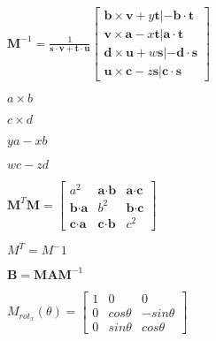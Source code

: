 \documentclass{article}
\def\lthtmlcheckvsize{\ifdim\ht\sizebox<\vsize 
  \ifdim\wd\sizebox<\hsize\expandafter\hfill\fi \expandafter\vfill
  \else\expandafter\vss\fi}%
\begin{document}
{\newpage\clearpage
{}%
$ \textbf{M}^{-1} = \frac{1}{\textbf{s} \cdot \textbf{v} + \textbf{t} \cdot \textbf{u}}
\begin{bmatrix}
\textbf{b} \times \textbf{v} + y\textbf{t} | -\textbf{b} \cdot \textbf{t} \\
\textbf{v} \times \textbf{a} - x\textbf{t} | \textbf{a} \cdot \textbf{t} \\
\textbf{d} \times \textbf{u} + w\textbf{s} | -\textbf{d} \cdot \textbf{s} \\
\textbf{u} \times \textbf{c} - z\textbf{s} | \textbf{c} \cdot \textbf{s}
\end{bmatrix}
$%
\lthtmlindisplaymathZ
\lthtmlcheckvsize\clearpage}

{\newpage\clearpage
{}%
$ a \times b$%
\lthtmlindisplaymathZ
\lthtmlcheckvsize\clearpage}

{\newpage\clearpage
{}%
$ c \times d$%
\lthtmlindisplaymathZ
\lthtmlcheckvsize\clearpage}

{\newpage\clearpage
{}%
$ ya -xb$%
\lthtmlindisplaymathZ
\lthtmlcheckvsize\clearpage}

{\newpage\clearpage
{}%
$ wc -zd$%
\lthtmlindisplaymathZ
\lthtmlcheckvsize\clearpage}

{\newpage\clearpage
{}%
$ \textbf{M}^T \textbf{M} = \begin{bmatrix}
a^2 & \textbf{a} \cdot \textbf{b} & \textbf{a} \cdot \textbf{c} \\
\textbf{b} \cdot \textbf{a} & b^2 & \textbf{b} \cdot \textbf{c} \\
\textbf{c} \cdot \textbf{a} & \textbf{c} \cdot \textbf{b} & c^2
\end{bmatrix}
$%
\lthtmlindisplaymathZ
\lthtmlcheckvsize\clearpage}

{\newpage\clearpage
{}%
$ M^T = M^-1$%
\lthtmlindisplaymathZ
\lthtmlcheckvsize\clearpage}

{\newpage\clearpage
{}%
$ \textbf{B} = \textbf{M} \textbf{A} \textbf{M}^{-1} $%
\lthtmlindisplaymathZ
\lthtmlcheckvsize\clearpage}

{\newpage\clearpage
{}%
$ M_{rot_x}(\theta) = \begin{bmatrix}
1 & 0 & 0 \\
0 & cos \theta & -sin \theta \\
0 & sin \theta & cos \theta
\end{bmatrix}
$%
\lthtmlindisplaymathZ
\lthtmlcheckvsize\clearpage}
\end{document}
